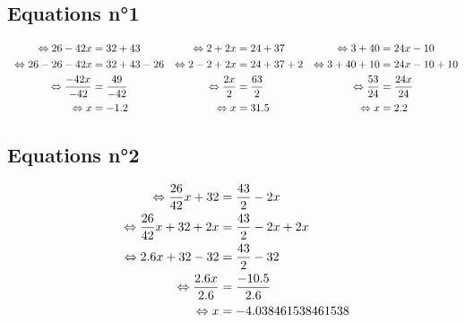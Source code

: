 \documentclass{article}%
\begin{document}
\subsection{Equations n°1}%
\label{subsec:Equationsn1}%
\begin{align*}%
\  \Leftrightarrow 26 - 42x &= 32 + 43     & \Leftrightarrow 2 + 2x  &= 24 + 37       & \Leftrightarrow 3 + 40 &= 24x - 10\\%
\vspace{5mm}%
\newline%
\  \Leftrightarrow 26 - 26 - 42x &= 32 + 43 -26      & \Leftrightarrow 2 - 2 + 2x  &= 24 + 37 + 2        & \Leftrightarrow 3 + 40 + 10 &= 24x - 10 +10\\%
\vspace{5mm}%
\newline%
\  \Leftrightarrow \frac{-42x}{-42} &= \frac{49}{-42}      & \Leftrightarrow \frac{2x}{2} &= \frac{63}{2}      & \Leftrightarrow \frac{53}{24} &= \frac{24x}{24}\\%
\vspace{5mm}%
\newline%
\  \Leftrightarrow  x &= -1.2      & \Leftrightarrow  x &= 31.5      & \Leftrightarrow  x &= 2.2\\%
\end{align*}

%
\subsection{Equations n°2}%
\label{subsec:Equationsn2}%
\begin{align*}%
\  \Leftrightarrow \frac{26}{42}x + 32 &= \frac{43}{2} - 2x \\%
\vspace{5mm}%
\newline%
\  \Leftrightarrow \frac{26}{42}x + 32 + 2x  &= \frac{43}{2} - 2x +2x \\%
\vspace{5mm}%
\newline%
\  \Leftrightarrow 2.6x + 32 - 32 &= \frac{43}{2}	- 32 \\%
\vspace{5mm}%
\newline%
\  \Leftrightarrow \frac{2.6x}{2.6} &= \frac{-10.5}{2.6} \\%
\vspace{5mm}%
\newline%
\  \Leftrightarrow x &= -4.038461538461538 \\%
\vspace{5mm}%
\newline%
\end{align*}

%
\newpage%
\end{document}
